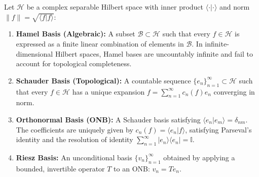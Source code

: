 \documentclass{optica-article}
\begin{document}
\begin{table}[htbp]
\centering
\caption{Systematic hierarchy of expansion systems in separable Hilbert spaces.}
\label{tab:hierarchy_table}
\end{table}

Let $\mathcal{H}$ be a complex separable Hilbert space with inner product $\langle \cdot | \cdot \rangle$ and norm $\|f\| = \sqrt{\langle f | f \rangle}$:
\begin{enumerate}
    \item \textbf{Hamel Basis (Algebraic):} A subset $\mathcal{B} \subset \mathcal{H}$ such that every $f \in \mathcal{H}$ is expressed as a finite linear combination of elements in $\mathcal{B}$. In infinite-dimensional Hilbert spaces, Hamel bases are uncountably infinite and fail to account for topological completeness.
    \item \textbf{Schauder Basis (Topological):} A countable sequence $\{e_n\}_{n=1}^\infty \subset \mathcal{H}$ such that every $f \in \mathcal{H}$ has a unique expansion $f = \sum_{n=1}^\infty c_n(f) e_n$ converging in norm.
    \item \textbf{Orthonormal Basis (ONB):} A Schauder basis satisfying $\langle e_n | e_m \rangle = \delta_{nm}$. The coefficients are uniquely given by $c_n(f) = \langle e_n | f \rangle$, satisfying Parseval's identity and the resolution of identity $\sum_{n=1}^\infty |e_n\rangle \langle e_n| = \mathbb{I}$.
    \item \textbf{Riesz Basis:} An unconditional basis $\{v_n\}_{n=1}^\infty$ obtained by applying a bounded, invertible operator $T$ to an ONB: $v_n = T e_n$.
\end{enumerate}
\end{document}
